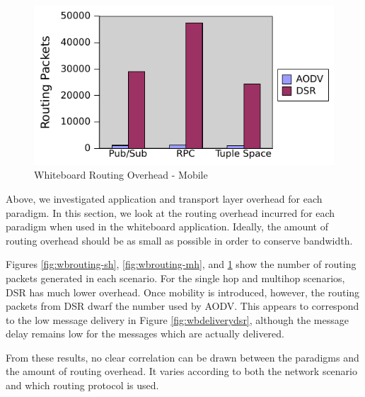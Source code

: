 \begin{figure}
\centering
\includegraphics[scale = 1]{figures/mobile-routing.pdf}
\caption{Whiteboard Routing Overhead - Mobile}
\label{fig:wbrouting-m}
\end{figure}

Above, we investigated application and transport layer overhead for each paradigm. In this section, we look at the routing overhead incurred for each paradigm when used in the whiteboard application. Ideally, the amount of routing overhead should be as small as possible in order to conserve bandwidth.

Figures \ref{fig:wbrouting-sh}, \ref{fig:wbrouting-mh}, and \ref{fig:wbrouting-m} show the number of routing packets generated in each scenario. For the single hop and multihop scenarios, DSR has much lower overhead. Once mobility is introduced, however, the routing packets from DSR dwarf the number used by AODV. This appears to correspond to the low message delivery in Figure \ref{fig:wbdeliverydsr}, although the message delay remains low for the messages which are actually delivered.

From these results, no clear correlation can be drawn between the paradigms and the amount of routing overhead. It varies according to both the network scenario and which routing protocol is used.

